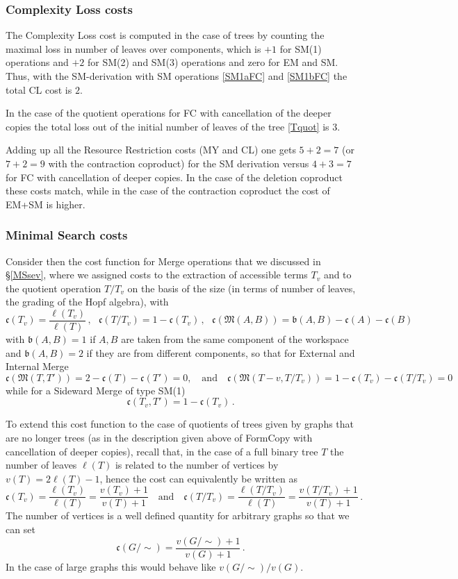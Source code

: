 \documentclass[12pt]{amsart}
\numberwithin{equation}{section}
\def\fM{{\mathfrak M}}
\def\fc{{\mathfrak c}}
\def\fb{{\mathfrak b}}
\begin{document}
\smallskip
\subsubsection{Complexity Loss costs} 

The Complexity Loss cost is computed in the case of trees by counting the maximal loss in
number of leaves over components, which is $+1$ for SM(1) operations and $+2$ for SM(2)
and SM(3) operations and zero for EM and SM. Thus, with the SM-derivation with
SM operations   \eqref{SM1aFC} and \eqref{SM1bFC} the total CL cost is $2$.

In the case of the quotient operations for FC with cancellation of the deeper copies
the total loss out of the initial number of leaves of the tree \eqref{Tquot} is $3$.

Adding up all the Resource Restriction costs (MY and CL) one gets
$5+2=7$ (or $7+2=9$ with the contraction coproduct) for the SM derivation
versus $4+3=7$ for FC with cancellation of deeper copies. In the case
of the deletion coproduct these costs match, while in the case of
the contraction coproduct the cost of EM+SM is higher. 


\smallskip
\subsubsection{Minimal Search costs}

Consider then the cost function for Merge operations that we discussed in \S \ref{MSsev},
where we assigned costs to the extraction of accessible terms $T_v$ and to
the quotient operation $T/T_v$ on the basis of the size (in terms of number of
leaves, the grading of the Hopf algebra), with
$$ \fc(T_v) =\frac{\ell(T_v)}{\ell(T)} \, , \ \ \  \fc(T/T_v)=1-\fc(T_v) \, , \ \ \  
\fc(\fM(A, B))=\fb(A,B) -\fc(A)-\fc(B) $$
with $\fb(A,B)=1$ if $A,B$ are taken from the same component of the workspace
and $\fb(A,B)=2$ if they are from different components, so that for External and Internal Merge
$$ \fc(\fM(T,T'))=2-\fc(T)-\fc(T')=0, \ \ \ \text{ and } \ \ \ \fc(\fM(T-v, T/T_v))=1-\fc(T_v)-\fc(T/T_v)=0 $$
while for a Sideward Merge of type SM(1)
$$ \fc(T_v,T')= 1-\fc(T_v)  \, . $$

\smallskip

 To extend this cost function to the case of quotients of trees given by graphs that are 
 no longer trees (as in the description given above of FormCopy with cancellation
 of deeper copies), recall that, in the case of a full binary tree $T$ the number of 
 leaves $\ell(T)$ is related to the number of vertices by $v(T)=2 \ell(T) -1$, hence
 the cost can equivalently be written as
 $$ \fc(T_v) =\frac{\ell(T_v)}{\ell(T)}= \frac{v(T_v)+1}{v(T)+1} \ \ \ \text{ and } \ \ \
 \fc(T/T_v) =\frac{\ell(T/T_v)}{\ell(T)}= \frac{v(T/T_v)+1}{v(T)+1}\, . $$
 The number of vertices is a well defined quantity for arbitrary graphs so that
 we can set
 $$ \fc(G/\sim)=\frac{v(G/\sim)+1}{v(G)+1} \, . $$
 In the case of large graphs this would behave like $v(G/\sim)/v(G)$.
 
\end{document}

